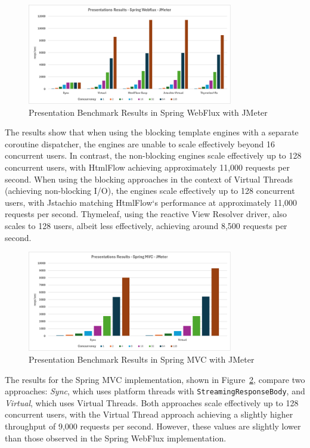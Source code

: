 \begin{figure}[h]
     \centering
     \includegraphics[width=0.8\textwidth]{./Graphs/presentations-webflux-jmeter.png}
     \caption{Presentation Benchmark Results in Spring WebFlux with JMeter}\label{fig:presentations-webflux-jmeter}
\end{figure}

The results show that when using the blocking template engines with a separate
coroutine dispatcher, the engines are unable to scale effectively beyond 16
concurrent users. In contrast, the non-blocking engines scale effectively up to
128 concurrent users, with HtmlFlow achieving approximately 11,000 requests per
second. When using the blocking approaches in the context of Virtual Threads
(achieving non-blocking I/O), the engines scale effectively up to 128
concurrent users, with Jstachio matching HtmlFlow`s performance at
approximately 11,000 requests per second. Thymeleaf, using the reactive View
Resolver driver, also scales to 128 users, albeit less effectively, achieving
around 8,500 requests per second.

\begin{figure}[h]
     \centering
     \includegraphics[width=0.8\textwidth]{./Graphs/presentations-springmvc-jmeter.png}
     \caption{Presentation Benchmark Results in Spring MVC with JMeter}\label{fig:presentations-springmvc-jmeter}
\end{figure}

The results for the Spring MVC implementation, shown in
Figure~\ref{fig:presentations-springmvc-jmeter}, compare two approaches:
\textit{Sync}, which uses platform threads with \texttt{StreamingResponseBody},
and \textit{Virtual}, which uses Virtual Threads. Both approaches scale
effectively up to 128 concurrent users, with the Virtual Thread approach
achieving a slightly higher throughput of 9,000 requests per second. However,
these values are slightly lower than those observed in the Spring WebFlux
implementation.

